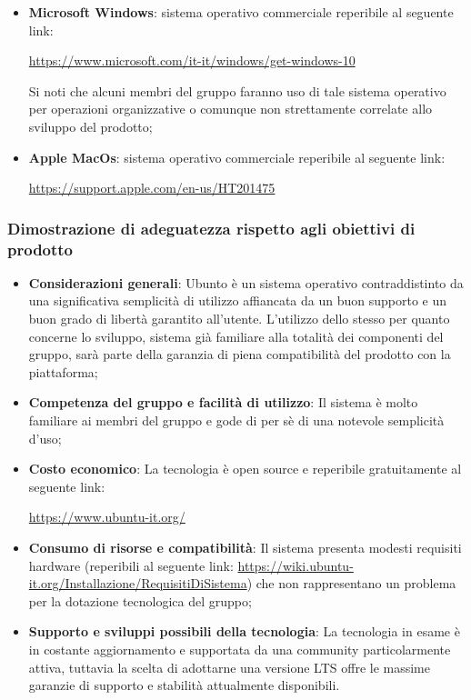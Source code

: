\documentclass[./../Technology Baseline.tex]{subfiles}
\begin{document}
\begin{itemize}
	\item \textbf{Microsoft Windows}: sistema operativo commerciale reperibile al seguente link:
	\begin{center}
		\url{https://www.microsoft.com/it-it/windows/get-windows-10}
	\end{center}
	Si noti che alcuni membri del gruppo faranno uso di tale sistema operativo per operazioni organizzative o comunque non strettamente correlate allo sviluppo del prodotto;  
	
	\item \textbf{Apple MacOs}: sistema operativo commerciale reperibile al seguente link:
	\begin{center}
		\url{https://support.apple.com/en-us/HT201475}
	\end{center}
\end{itemize}


\subsubsection{Dimostrazione di adeguatezza rispetto agli obiettivi di prodotto}
\begin{itemize}
	\item \textbf{Considerazioni generali}: Ubunto è un sistema operativo contraddistinto da una significativa semplicità di utilizzo affiancata da un buon supporto e un buon grado di libertà garantito all'utente. L'utilizzo dello stesso per quanto concerne lo sviluppo, sistema già familiare alla totalità dei componenti del gruppo, sarà parte della garanzia di piena compatibilità del prodotto con la piattaforma;
	\item \textbf{Competenza del gruppo e facilità di utilizzo}: Il sistema è molto familiare ai membri del gruppo e gode di per sè di una notevole semplicità d'uso;
	\item \textbf{Costo economico}: La tecnologia è open source e reperibile gratuitamente al seguente link:
	\begin{center}
		\url{https://www.ubuntu-it.org/}
	\end{center}
	\item \textbf{Consumo di risorse e compatibilità}: Il sistema presenta modesti requisiti hardware (reperibili al seguente link: \url{https://wiki.ubuntu-it.org/Installazione/RequisitiDiSistema}) che non rappresentano un problema per la dotazione tecnologica del gruppo;
	\item \textbf{Supporto e sviluppi possibili della tecnologia}: La tecnologia in esame è in costante aggiornamento e supportata da una community particolarmente attiva, tuttavia la scelta di adottarne una versione LTS offre le massime garanzie di supporto e stabilità attualmente disponibili.
\end{itemize}
\end{document}

